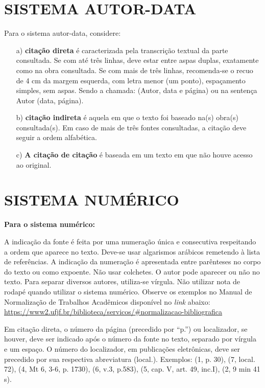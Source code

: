 \documentclass[
  oneside, %
  english,
  brazil
]{abntbibufjf}
\begin{document}
\section{SISTEMA AUTOR-DATA} %

Para o sistema autor-data, considere:
\begin{itemize}
  \item[a)] \textbf{citação direta} é caracterizada pela transcrição textual da parte consultada. Se com até três linhas, deve estar entre aspas duplas, exatamente como na obra consultada. Se com mais de três linhas, recomenda-se o recuo de 4 cm da margem esquerda, com letra menor (um ponto), espaçamento simples, sem aspas. Sendo a chamada: (Autor, data e página) ou na sentença Autor (data, página).
  \item[b)] \textbf{citação indireta} é aquela em que o texto foi baseado na(s) obra(s) consultada(s). Em caso de mais de três fontes consultadas, a citação deve seguir a ordem alfabética.
  \item[c)] \textbf{A citação de citação} é baseada em um texto em que não houve acesso ao original.
\end{itemize}



\section{SISTEMA NUMÉRICO} %

\textbf{Para o sistema numérico:}

A indicação da fonte é feita por uma numeração única e consecutiva respeitando a ordem que aparece no texto. Deve-se usar algarismos arábicos remetendo à lista de referências. A indicação da numeração é apresentada entre parênteses no corpo do texto ou como expoente. Não usar colchetes. O autor pode aparecer ou não no texto. Para separar diversos autores, utiliza-se vírgula. Não utilizar nota de rodap\'{e} quando utilizar o sistema num\'{e}rico.
Observe os exemplos no Manual de Normalização de Trabalhos Acadêmicos disponível no \textit{link} abaixo: \\
\url{https://www2.ufjf.br/biblioteca/servicos/#normalizacao-bibliografica}

Em citação direta, o número da página (precedido por ``p.'') ou localizador, se houver, deve ser indicado após o número da fonte no texto, separado por vírgula e um espaço. O número do localizador, em publicações eletrônicas, deve ser precedido por sua respectiva abreviatura (local.). Exemplos: (1, p. 30), (7, local. 72), (4, Mt 6, 3-6, p. 1730), (6, v.3, p.583), (5, cap. V, art. 49, inc.I), (2, 9 min 41 s).
\end{document}

